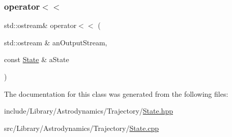 \subsubsection{\texorpdfstring{operator$<$$<$}{operator<<}}
{\footnotesize\ttfamily std\+::ostream\& operator$<$$<$ (\begin{DoxyParamCaption}\item[{std\+::ostream \&}]{an\+Output\+Stream,  }\item[{const \hyperlink{classlibrary_1_1astro_1_1trajectory_1_1_state}{State} \&}]{a\+State }\end{DoxyParamCaption})\hspace{0.3cm}{\ttfamily [friend]}}



The documentation for this class was generated from the following files\+:\begin{DoxyCompactItemize}
\item 
include/\+Library/\+Astrodynamics/\+Trajectory/\hyperlink{_state_8hpp}{State.\+hpp}\item 
src/\+Library/\+Astrodynamics/\+Trajectory/\hyperlink{_state_8cpp}{State.\+cpp}\end{DoxyCompactItemize}
